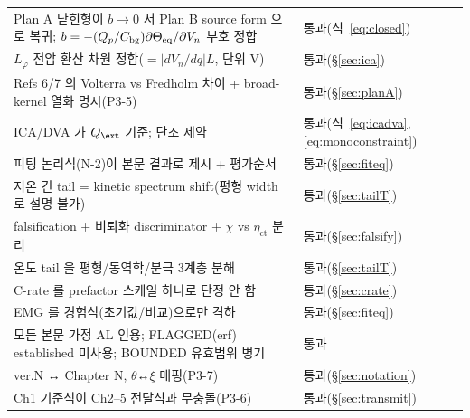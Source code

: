 \begin{longtable}{p{} p{}}
Plan A 닫힌형이 $b\to0$ 서 Plan B source form 으로 복귀; $b=-(Q_p/C_{\mathrm{bg}})\partial\Theta_{\mathrm{eq}}/\partial V_n$ 부호 정합 & 통과(식~\eqref{eq:closed}) \\
$L_\varphi$ 전압 환산 차원 정합($=|dV_n/dq|L$, 단위 V) & 통과(\S\ref{sec:ica}) \\
Refs 6/7 의 Volterra vs Fredholm 차이 + broad-kernel 열화 명시(P3-5) & 통과(\S\ref{sec:planA}) \\
ICA/DVA 가 $Q_\ext$ 기준; 단조 제약 & 통과(식~\eqref{eq:icadva},\eqref{eq:monoconstraint}) \\
피팅 논리식(N-2)이 본문 결과로 제시 + 평가순서 & 통과(\S\ref{sec:fiteq}) \\
저온 긴 tail = kinetic spectrum shift(평형 width 로 설명 불가) & 통과(\S\ref{sec:tailT}) \\
falsification + 비퇴화 discriminator + $\chi$ vs $\eta_\mathrm{ct}$ 분리 & 통과(\S\ref{sec:falsify}) \\
온도 tail 을 평형/동역학/분극 3계층 분해 & 통과(\S\ref{sec:tailT}) \\
C-rate 를 prefactor 스케일 하나로 단정 안 함 & 통과(\S\ref{sec:crate}) \\
EMG 를 경험식(초기값/비교)으로만 격하 & 통과(\S\ref{sec:fiteq}) \\
모든 본문 가정 AL 인용; FLAGGED(erf) established 미사용; BOUNDED 유효범위 병기 & 통과 \\
ver.N ↔ Chapter N, $\theta$↔$\xi$ 매핑(P3-7) & 통과(\S\ref{sec:notation}) \\
Ch1 기준식이 Ch2--5 전달식과 무충돌(P3-6) & 통과(\S\ref{sec:transmit}) \\
\bottomrule
\end{longtable}


